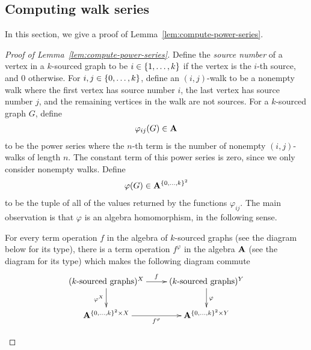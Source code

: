 \subsection{Computing walk series}
In this section, we give a proof of Lemma~\ref{lem:compute-power-series}.
\lemcomputePowerSeries*
\begin{proof}[Proof of Lemma~\ref{lem:compute-power-series}]
	
	
	Define the \emph{source number} of a vertex in a $k$-sourced graph to be  $i \in \{1,\ldots,k\}$ if the vertex is the $i$-th source, and $0$ otherwise. For
	$i,j \in \{0,\ldots,k\}$,
	define an $(i,j)$-walk to be a nonempty walk where the first vertex has source number $i$, the last vertex has source number $j$, and the remaining vertices in the walk are not sources. For a $k$-sourced graph $G$, define 
	\begin{align*}
	\varphi_{ij}(G) \in \mathbf{A}
	\end{align*}
	to be the power series where the $n$-th term is the number of nonempty $(i,j)$-walks of length $n$. The constant term  of this power series is zero, since we only consider nonempty walks. Define 
	\begin{align*}
	\varphi(G) \in \mathbf{A}^{\{0,\ldots,k\}^2}
	\end{align*}
	to be the tuple of all of the values returned by the functions $\varphi_{ij}$. 
	The main observation is that $\varphi$ is an algebra homomorphism, in the following sense.
	\begin{claim}
		For every term operation $f$ 
		in the algebra of $k$-sourced graphs (see the diagram below for its type), there is a term operation $f^\varphi$ in the algebra $\mathbf{A}$ (see the diagram for its type) which makes the following diagram commute
		\begin{align*}
		\xymatrix{
			(\text{$k$-sourced graphs})^X 
			\ar[r]^f
			\ar[d]_{\varphi^X}
			&
			(\text{$k$-sourced graphs})^Y
			\ar[d]^\varphi
			\\
			\aalg^{\set{0,\ldots,k}^2 \times X}
			\ar[r]_{f^\varphi}
			&
			\aalg^{\set{0,\ldots,k}^2 \times Y}
		}

\end{align*}
\end{claim}
\end{proof}
